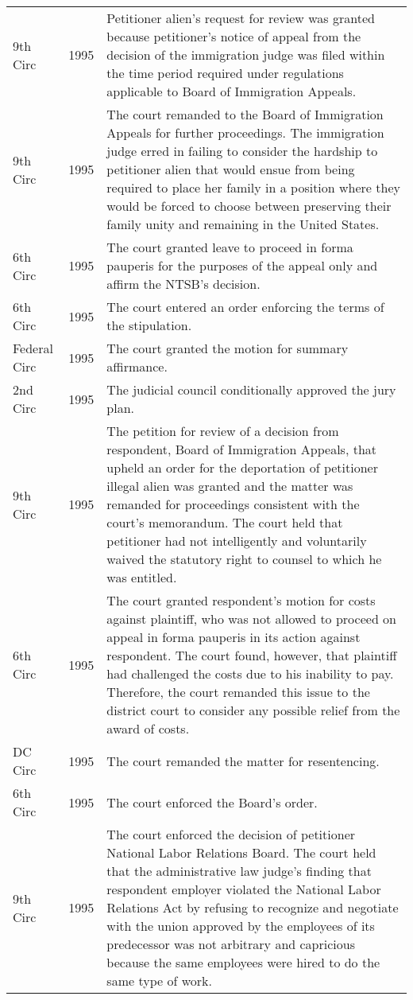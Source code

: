 \documentclass[10pt, letterpaper]{article}
\begin{document}
\begin{spacing}{1.0}
\begin{small}
\begin{longtable}[H]{llp{5in}}
    9th Circ & 1995 & Petitioner alien's request for review was granted because petitioner's notice of appeal from the decision of the immigration judge was filed within the time period required under regulations applicable to Board of Immigration Appeals.\\[4pt]
    9th Circ & 1995 & The court remanded to the Board of Immigration Appeals for further proceedings. The immigration judge erred in failing to consider the hardship to petitioner alien that would ensue from being required to place her family in a position where they would be forced to choose between preserving their family unity and remaining in the United States.\\[4pt]
    6th Circ & 1995 & The court granted leave to proceed in forma pauperis for the purposes of the appeal only and affirm the NTSB's decision.\\[4pt]
    6th Circ & 1995 & The court entered an order enforcing the terms of the stipulation.\\[4pt]
    Federal Circ & 1995 & The court granted the motion for summary affirmance.\\[4pt]
    2nd Circ & 1995 & The judicial council conditionally approved the jury plan.\\[4pt]
    9th Circ & 1995 & The petition for review of a decision from respondent, Board of Immigration Appeals, that upheld an order for the deportation of petitioner illegal alien was granted and the matter was remanded for proceedings consistent with the court's memorandum. The court held that petitioner had not intelligently and voluntarily waived the statutory right to counsel to which he was entitled.\\[4pt]
    6th Circ & 1995 & The court granted respondent's motion for costs against plaintiff, who was not allowed to proceed on appeal in forma pauperis in its action against respondent. The court found, however, that plaintiff had challenged the costs due to his inability to pay. Therefore, the court remanded this issue to the district court to consider any possible relief from the award of costs.\\[4pt]
    DC Circ & 1995 & The court remanded the matter for resentencing.\\[4pt]
    6th Circ & 1995 & The court enforced the Board's order.\\[4pt]
    9th Circ & 1995 & The court enforced the decision of petitioner National Labor Relations Board. The court held that the administrative law judge's finding that respondent employer violated the National Labor Relations Act by refusing to recognize and negotiate with the union approved by the employees of its predecessor was not arbitrary and capricious because the same employees were hired to do the same type of work.\\[4pt]

\end{longtable}
\end{small}
\end{spacing}
\end{document}

